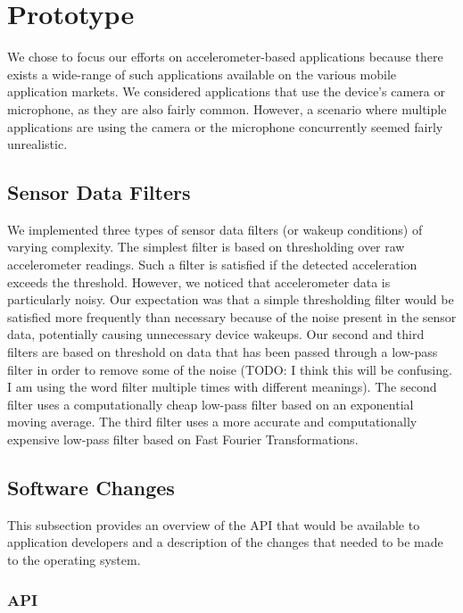 
\section{Prototype}
\label{sec:prototype}

We chose to focus our efforts on accelerometer-based applications because there exists a wide-range of such applications available on the various mobile application markets. We considered applications that use the device's camera or microphone, as they are also fairly common. However, a scenario where multiple applications are using the camera or the microphone concurrently seemed fairly unrealistic.

\subsection{Sensor Data Filters}

We implemented three types of sensor data filters (or wakeup conditions) of varying complexity. The simplest filter is based on thresholding over raw accelerometer readings. Such a filter is satisfied if the detected acceleration exceeds the threshold. However, we noticed that accelerometer data is particularly noisy. Our expectation was that a simple thresholding filter would be satisfied more frequently than necessary because of the noise present in the sensor data, potentially causing unnecessary device wakeups. Our second and third filters are based on threshold on data that has been passed through a low-pass filter in order to remove some of the noise (TODO: I think this will be confusing. I am using the word filter multiple times with different meanings). The second filter uses a computationally cheap low-pass filter based on an exponential moving average. The third filter uses a more accurate and computationally expensive low-pass filter based on Fast Fourier Transformations.

\subsection{Software Changes}

This subsection provides an overview of the API that would be available to application developers and a description of the changes that needed to be made to the operating system.
 
\subsubsection{API}

